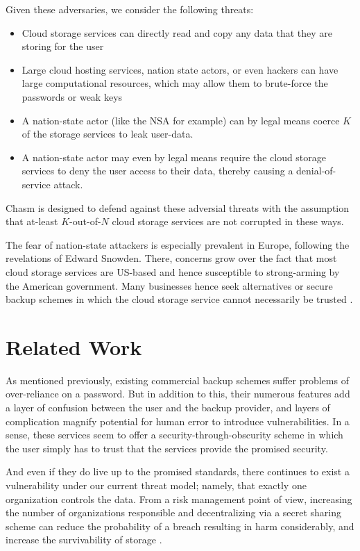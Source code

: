\documentclass[letterpaper,twocolumn,10pt]{article}
\begin{document}
Given these adversaries, we consider the following threats:
\begin{itemize}
	\item Cloud storage services can directly read and copy any data that they are storing for the user
	\item Large cloud hosting services, nation state actors, or even hackers can have large computational resources, which may allow them to brute-force the passwords or weak keys
	\item A nation-state actor (like the NSA for example) can by legal means coerce $K$ of the storage services to leak user-data.
	\item A nation-state actor may even by legal means require the cloud storage services to deny the user access to their data, thereby causing a denial-of-service attack.

\end{itemize}
Chasm is designed to defend against these adversial threats with the assumption that at-least $K$-out-of-$N$ cloud storage services are not corrupted in these ways.

The fear of nation-state attackers is especially prevalent in Europe, following the revelations of Edward Snowden. There, concerns grow over the fact that most cloud storage services are US-based and hence susceptible to strong-arming by the American government. Many businesses hence seek alternatives or secure backup schemes in which the cloud storage service cannot necessarily be trusted \cite{gastermann}.

\section{Related Work}

As mentioned previously, existing commercial backup schemes suffer problems of over-reliance on a password. But in addition to this, their numerous features add a layer of confusion between the user and the backup provider, and layers of complication magnify potential for human error to introduce vulnerabilities. In a sense, these services seem to offer a security-through-obscurity scheme in which the user simply has to trust that the services provide the promised security.

And even if they do live up to the promised standards, there continues to exist a vulnerability under our current threat model; namely, that exactly one organization controls the data. From a risk management point of view, increasing the number of organizations responsible and decentralizing via a secret sharing scheme can reduce the probability of a breach resulting in harm considerably, and increase the survivability of storage \cite{wylie}.
\end{document}
